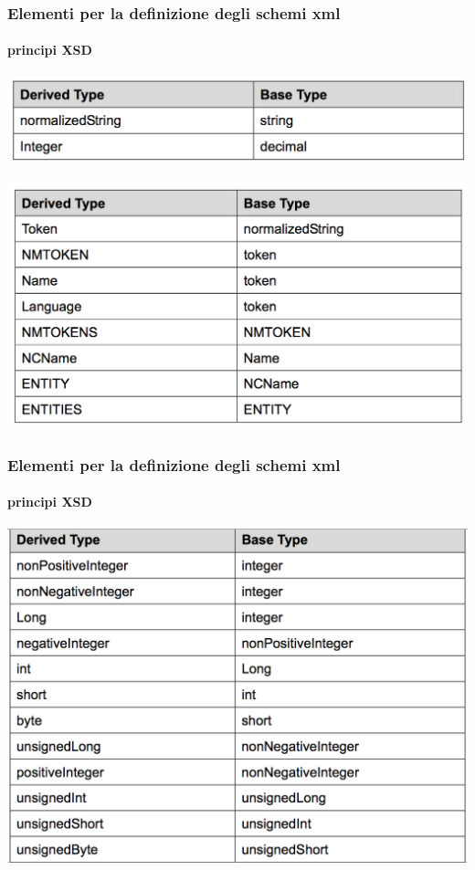 \begin{frame}
	\frametitle{Elementi per la definizione degli schemi xml}
	\framesubtitle{principi XSD}
	\addtocounter{nframe}{1}

	\begin{center}
		\includegraphics[width=.95\textwidth]{imgs/DerivedTypeBaseType(2types).png}
	\end{center}
	\begin{center}
		\includegraphics[width=.95\textwidth]{imgs/DerivedTypeFromDerivedType(8types).png}
	\end{center}

\end{frame}

\begin{frame}
	\frametitle{Elementi per la definizione degli schemi xml}
	\framesubtitle{principi XSD}
	\addtocounter{nframe}{1}

	\begin{center}
		\includegraphics[width=.95\textwidth]{imgs/NumericalDerivedType(12types).png}
	\end{center}

\end{frame}



